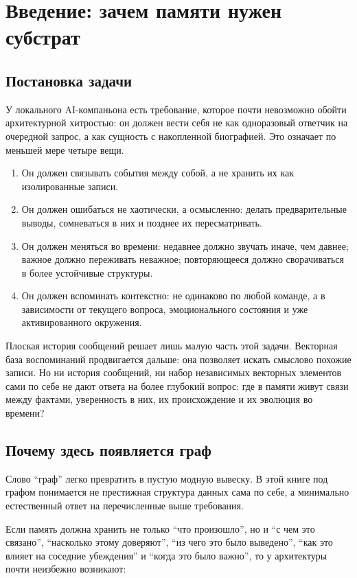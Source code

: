 \chapter{Введение: зачем памяти нужен субстрат}

\section{Постановка задачи}

У локального AI-компаньона есть требование, которое почти невозможно
обойти архитектурной хитростью: он должен вести себя не как одноразовый
ответчик на очередной запрос, а как сущность с накопленной биографией. Это
означает по меньшей мере четыре вещи.

\begin{enumerate}
\item Он должен связывать события между собой, а не хранить их как изолированные записи.
\item Он должен ошибаться не хаотически, а осмысленно: делать предварительные выводы, сомневаться в них и позднее их пересматривать.
\item Он должен меняться во времени: недавнее должно звучать иначе, чем давнее; важное должно переживать неважное; повторяющееся должно сворачиваться в более устойчивые структуры.
\item Он должен вспоминать контекстно: не одинаково по любой команде, а в зависимости от текущего вопроса, эмоционального состояния и уже активированного окружения.
\end{enumerate}

Плоская история сообщений решает лишь малую часть этой задачи. Векторная база
воспоминаний продвигается дальше: она позволяет искать смыслово похожие записи.
Но ни история сообщений, ни набор независимых векторных элементов сами по себе
не дают ответа на более глубокий вопрос: где в памяти живут связи между фактами,
уверенность в них, их происхождение и их эволюция во времени?

\section{Почему здесь появляется граф}

Слово ``граф'' легко превратить в пустую модную вывеску. В этой книге под
графом понимается не престижная структура данных сама по себе, а минимально
естественный ответ на перечисленные выше требования.

Если память должна хранить не только ``что произошло'', но и ``с чем это
связано'', ``насколько этому доверяют'', ``из чего это было выведено'', ``как это
влияет на соседние убеждения'' и ``когда это было важно'', то у архитектуры
почти неизбежно возникают:

